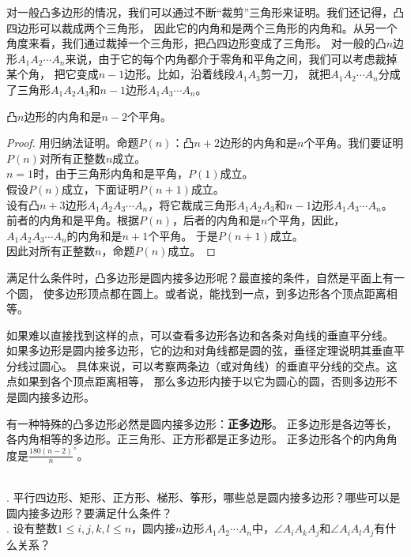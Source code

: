 \documentclass[12pt,UTF8]{ctexbook}
\begin{document}
对一般凸多边形的情况，我们可以通过不断“裁剪”三角形来证明。我们还记得，凸四边形可以裁成两个三角形，
因此它的内角和是两个三角形的内角和。从另一个角度来看，我们通过裁掉一个三角形，把凸四边形变成了三角形。
对一般的凸$n$边形$A_1A_2\cdots A_n$来说，由于它的每个内角都介于零角和平角之间，我们可以考虑裁掉某个角，
把它变成$n-1$边形。比如，沿着线段$A_1A_3$剪一刀，
就把$A_1A_2\cdots A_n$分成了三角形$A_1A_2A_3$和$n-1$边形$A_1A_3\cdots A_n$。

\begin{tm}\label{tm:1-4-0}
    凸$n$边形的内角和是$n-2$个平角。
\end{tm}
\begin{proof}
    用归纳法证明。命题$P(n)$：凸$n+2$边形的内角和是$n$个平角。我们要证明$P(n)$对所有正整数$n$成立。\\
    $n=1$时，由于三角形内角和是平角，$P(1)$成立。\\
    假设$P(n)$成立，下面证明$P(n+1)$成立。\\
    设有凸$n+3$边形$A_1A_2A_3\cdots A_n$，将它裁成三角形$A_1A_2A_3$和$n-1$边形$A_1A_3\cdots A_n$。
    前者的内角和是平角。根据$P(n)$，后者的内角和是$n$个平角，因此，$A_1A_2A_3\cdots A_n$的内角和是$n+1$个平角。
    于是$P(n+1)$成立。\\
    因此对所有正整数$n$，命题$P(n)$成立。
\end{proof}

满足什么条件时，凸多边形是圆内接多边形呢？最直接的条件，自然是平面上有一个圆，
使多边形顶点都在圆上。或者说，能找到一点，到多边形各个顶点距离相等。

如果难以直接找到这样的点，可以查看多边形各边和各条对角线的垂直平分线。
如果多边形是圆内接多边形，它的边和对角线都是圆的弦，垂径定理说明其垂直平分线过圆心。
具体来说，可以考察两条边（或对角线）的垂直平分线的交点。这点如果到各个顶点距离相等，
那么多边形内接于以它为圆心的圆，否则多边形不是圆内接多边形。

有一种特殊的凸多边形必然是圆内接多边形：\textbf{正多边形}。
正多边形是各边等长，各内角相等的多边形。正三角形、正方形都是正多边形。
正多边形各个的内角角度是$\frac{180(n-2)}{n}^\circ$。

\begin{xt}\label{xt:1-4-0}
    \mbox{}\\
    . 平行四边形、矩形、正方形、梯形、筝形，哪些总是圆内接多边形？哪些可以是圆内接多边形？要满足什么条件？\\
    . 设有整数$1 \leqslant i,j,k,l \leqslant n$，圆内接$n$边形$A_1A_2\cdots A_n$中，$\angle A_iA_kA_j$和$\angle A_iA_lA_j$有什么关系？
\end{xt}
\end{document}
